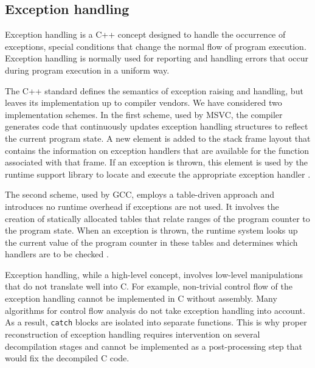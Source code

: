 \documentclass[10pt, conference, compsocconf]{IEEEtran}
\newcommand{\skipsectionspace}{}
\begin{document}
\subsection{Exception handling}\skipsectionspace
%
%
Exception handling is a C++ concept designed to handle the occurrence of exceptions, 
special conditions that change the normal flow of program execution. 
Exception handling is normally used for reporting and handling errors that 
occur during program execution in a uniform way.


The C++ standard defines the semantics of exception raising and handling,
but leaves its implementation up to compiler vendors. 
We have considered two implementation schemes.
In the first scheme, used by MSVC, the compiler generates code that continuously updates exception 
handling structures to reflect the current program state. 
A new element is added to the stack frame layout that
contains the information on exception handlers that are available
for the function associated with that frame.
If an exception is thrown, this element is used by the runtime support library
to locate and execute the appropriate exception handler \cite{kocchar02}.

The second scheme, used by GCC, employs a table-driven approach and introduces no 
runtime overhead if exceptions are not used. 
It involves the creation of statically allocated tables that
relate ranges of the program counter to the program state. 
When an exception is thrown,
the runtime system looks up the current value of the program counter in
these tables and determines which handlers are to be checked \cite{gccabi}.

Exception handling, while a high-level concept, involves low-level
manipulations that do not translate well into C. For example, non-trivial 
control flow of the exception handling cannot be implemented
in C without assembly. 
Many algorithms for control flow analysis \cite{muchnick97} do not take exception handling into account. %
As a result, \lstinline{catch} blocks are isolated into separate functions. 
This is why proper reconstruction of
exception handling requires intervention on several decompilation stages 
and cannot be implemented as a post-processing step that would
fix the decompiled C code.
\end{document}
